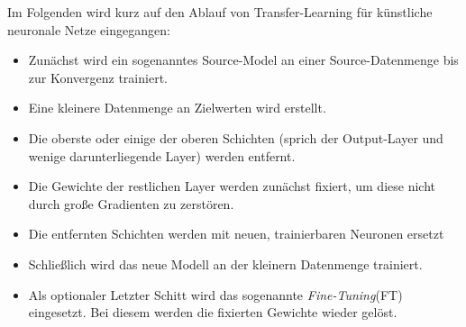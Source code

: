 Im Folgenden wird kurz auf den Ablauf von Transfer-Learning für künstliche neuronale Netze eingegangen:
\begin{itemize}
	\setlength\itemsep{0.1cm}
	\setlength{\parskip}{0.1cm}
	\item Zunächst wird ein sogenanntes Source-Model an einer Source-Datenmenge bis zur Konvergenz trainiert. 
	\item Eine kleinere Datenmenge an Zielwerten wird erstellt.
	\item Die oberste oder einige der oberen Schichten (sprich der Output-Layer und wenige darunterliegende Layer) werden entfernt.
	\item Die Gewichte der restlichen Layer werden zunächst fixiert, um diese nicht durch große Gradienten zu zerstören.
	\item Die entfernten Schichten werden mit neuen, trainierbaren Neuronen ersetzt
	\item Schließlich wird das neue Modell an der kleinern Datenmenge trainiert.
	\item Als optionaler Letzter Schitt wird das sogenannte \textit{Fine-Tuning}(FT) eingesetzt. Bei diesem werden die fixierten Gewichte wieder gelöst.
\end{itemize}


